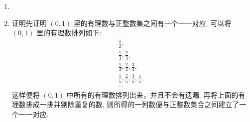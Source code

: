\documentclass[a4paper, 11pt]{ctexart}
\begin{document}
\begin{enumerate}
        \item %
        \item %
            {\heiti 证明}\quad 先证明 $(0, 1)$ 里的有理数与正整数集之间有一个一一对应. 可以将 $(0, 1)$ 里的有理数排列如下:
            \begin{gather*}
                \frac12, \\
                \frac13, \frac23, \\
                \frac14, \frac24, \frac34, \\
                \frac15, \frac25, \frac35, \frac45, \\
                \cdots
            \end{gather*}
            这样便将 $(0, 1)$ 中所有的有理数排列出来，并且不会有遗漏. 再将上面的有理数排成一排并剔除重复的数, 则所得的一列数便与正整数集合之间建立了一个一一对应.
        

\end{enumerate}
\end{document}
